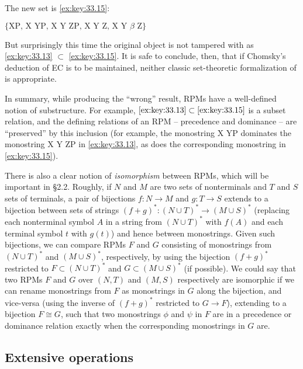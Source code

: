 \documentclass[output=paper]{langsci/langscibook}
\begin{document}
The new set is \eqref{ex:key:33.15}:

\ea\label{ex:key:33.15} $\{\text{XP, X YP, X Y ZP, X Y Z, X Y $\beta$ Z}\}$
\z

But surprisingly this time the original object is not tampered with as
\eqref{ex:key:33.13} $\subset$ \eqref{ex:key:33.15}. It is safe to conclude,
then, that if Chomsky's deduction of \gls{EC} is to be maintained, neither
classic set-theoretic formalization of  is appropriate.

In summary, while producing the \enquote{wrong} result, \glspl{RPM} have a
well-defined notion of substructure. For example, $\eqref{ex:key:33.13}\subset
\eqref{ex:key:33.15}$ is a subset relation, and the defining relations of an
\gls{RPM} -- precedence and dominance -- are \enquote{preserved} by this
inclusion (for example, the monostring X YP dominates the monostring X Y ZP in
\eqref{ex:key:33.13}, as does the corresponding monostring in
\eqref{ex:key:33.15}).

There is also a clear notion of \emph{isomorphism} between R\glspl{PM}, which
will be important in §2.2. Roughly, if $N$ and $M$ are two sets of nonterminals
and $T$ and $S$ sets of terminals, a pair of bijections $f: N\rightarrow M$ and
$g:T\rightarrow S$ extends to a bijection between sets of strings $(f+g)^*:
(N\cup T)^*\rightarrow (M\cup S)^*$ (replacing each nonterminal symbol $A$ in a
string from $(N\cup T)^*$ with $f(A)$ and each terminal symbol $t$ with
$g(t)$) and hence between monostrings. Given such bijections, we can compare
R\glspl{PM} $F$ and $G$ consisting of monostrings from $(N\cup T)^*$ and
$(M\cup S)^*$, respectively, by using the bijection $(f+g)^*$ restricted to
$F\subset(N\cup T)^*$ and $G\subset (M\cup S)^*$ (if possible). We could say
that two \glspl{RPM} $F$ and $G$ over $(N,T)$  and $(M,S)$ respectively are
isomorphic if we can rename monostrings from $F$ as monostrings in $G$ along
the bijection, and vice-versa (using the inverse of $(f+g)^*$ restricted to
$G\rightarrow F$), extending to a bijection $F\cong G$, such that two
monostrings $\phi$ and $\psi$ in $F$ are in a precedence or dominance relation
exactly when the corresponding monostrings in $G$ are.

\subsection{Extensive operations}
\end{document}
